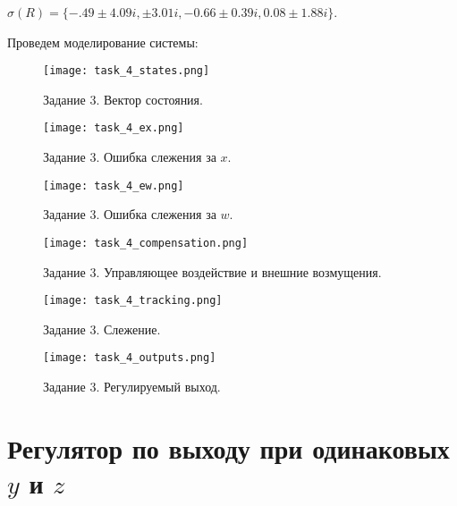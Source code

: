 $\sigma(R)=\{-.49\pm 4.09i, \pm 3.01i, -0.66\pm 0.39i, 0.08\pm 1.88i\}$.

Проведем моделирование системы:
\begin{figure}[]
    \centering
    \texttt{[image: task\_4\_states.png]}
    \caption{\label{fig:task4_3_2}Задание 3. Вектор состояния.}
\end{figure}
\begin{figure}[]
    \centering
    \texttt{[image: task\_4\_ex.png]}
    \caption{\label{fig:task4_3_2}Задание 3. Ошибка слежения за $x$.}
\end{figure}
\begin{figure}[]
    \centering
    \texttt{[image: task\_4\_ew.png]}
    \caption{\label{fig:task4_3_2}Задание 3. Ошибка слежения за $w$.}
\end{figure}

\begin{figure}[]
    \centering
    \texttt{[image: task\_4\_compensation.png]}
    \caption{\label{fig:task4_3_2}Задание 3. Управляющее воздействие и внешние возмущения.}
\end{figure}

\begin{figure}[]
    \centering
    \texttt{[image: task\_4\_tracking.png]}
    \caption{\label{fig:task4_3_2}Задание 3. Слежение.}
\end{figure}

\begin{figure}[]
    \centering
    \texttt{[image: task\_4\_outputs.png]}
    \caption{\label{fig:task4_3_2}Задание 3. Регулируемый выход.}
\end{figure}

\pagebreak

\section{Регулятор по выходу при одинаковых $y$ и $z$}

